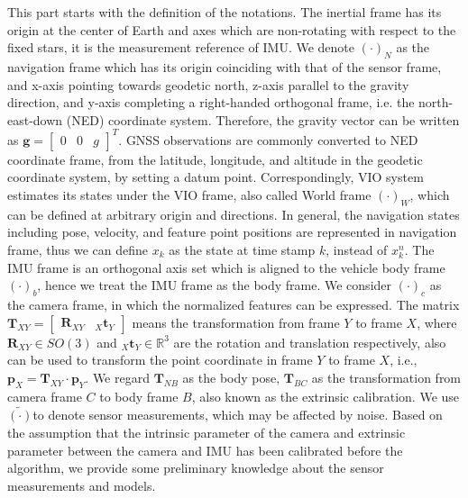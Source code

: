 \documentclass[journal,article,submit,moreauthors,pdftex]{Definitions/mdpi}
\begin{document}
This part starts with the definition of the notations. 
The inertial frame has its origin at the center of Earth and axes 
which are non-rotating with respect to the fixed stars, it is the 
measurement reference of IMU. 
We denote $\left( \cdot\right)_N$ as the navigation frame which has 
its origin coinciding with that of the sensor frame, and x-axis 
pointing towards geodetic north, z-axis parallel to the gravity 
direction, and y-axis completing a right-handed orthogonal frame, 
i.e. the north-east-down (NED) coordinate system. 
Therefore, the gravity vector can be written as $\boldsymbol{g} = \left[\begin{matrix} 0 & 0 & g \end{matrix}\right]^T$. 
GNSS observations are commonly converted to NED coordinate frame, 
from the latitude, longitude, and altitude in the geodetic coordinate 
system, by setting a datum point. 
Correspondingly, VIO system estimates its states under the VIO frame, 
also called World frame $\left( \cdot\right)_W$, which can be defined 
at arbitrary origin and directions.
In general, the navigation states including pose, velocity, and  
feature point positions are represented in navigation frame, thus we can 
define $x_k$ as the state at time stamp $k$, instead of $x_k^n$. 
The IMU frame is an orthogonal axis set which is aligned to the vehicle 
body frame $\left( \cdot\right)_b$, hence we treat the IMU frame as the 
body frame. 
We consider $\left( \cdot\right)_{c}$ as the camera frame, in which 
the normalized features can be expressed. 
The matrix $\boldsymbol{T}_{XY} = \left[\begin{matrix} \boldsymbol{R}_{XY} & _X\boldsymbol{t}_{Y} \end{matrix}\right]$ 
means the transformation from frame $Y$ to frame $X$, 
where $\boldsymbol{R}_{XY} \in SO(3)$ and $_X\boldsymbol{t}_{Y} \in \mathbb{R}^3$ 
are the rotation and translation respectively,  also can be used to 
transform the point coordinate in frame $Y$ to frame $X$, i.e., 
$\boldsymbol{p}_X = \boldsymbol{T}_{XY} \cdot \boldsymbol{p}_Y$. 
We regard $\boldsymbol{T}_{NB}$ as the body pose, $\boldsymbol{T}_{BC}$ 
as the transformation from camera frame $C$ to body frame $B$, also 
known as the extrinsic calibration. 
We use $\widetilde{(\cdot)}$to denote sensor measurements, which may 
be affected by noise. 
Based on the assumption that the intrinsic parameter of the camera and 
extrinsic parameter between the camera and IMU has been calibrated 
before the algorithm, we provide some preliminary knowledge about 
the sensor measurements and models.
\end{document}
